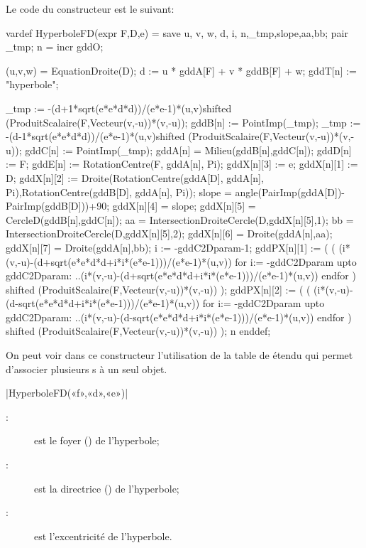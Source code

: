 \documentclass[a4paper,french]{article}
\begin{document}
Le code du constructeur est le suivant:
\begin{mpcode}
vardef HyperboleFD(expr F,D,e) =
  save u, v, w, d, i, n,_tmp,slope,aa,bb; 
  pair _tmp;
  n = incr gddO;

  (u,v,w) = EquationDroite(D);
  d := u * gddA[F] + v * gddB[F] + w;
  gddT[n] := "hyperbole"; 
  
  _tmp := -(d+1*sqrt(e*e*d*d))/(e*e-1)*(u,v)shifted (ProduitScalaire(F,Vecteur(v,-u))*(v,-u));
  gddB[n] := PointImp(_tmp);
  _tmp := -(d-1*sqrt(e*e*d*d))/(e*e-1)*(u,v)shifted
  (ProduitScalaire(F,Vecteur(v,-u))*(v,-u));
  gddC[n] := PointImp(_tmp);
  gddA[n] = Milieu(gddB[n],gddC[n]);
  gddD[n] := F;
  gddE[n] := RotationCentre(F, gddA[n], Pi);
  gddX[n][3] := e; %
  gddX[n][1] := D; %
  gddX[n][2] := Droite(RotationCentre(gddA[D], gddA[n], Pi),RotationCentre(gddB[D], gddA[n], Pi));
  slope = angle(PairImp(gddA[D])-PairImp(gddB[D]))+90;
  gddX[n][4] = slope;
  gddX[n][5] = CercleD(gddB[n],gddC[n]);
  aa = IntersectionDroiteCercle(D,gddX[n][5],1);
  bb = IntersectionDroiteCercle(D,gddX[n][5],2);
  gddX[n][6] = Droite(gddA[n],aa);
  gddX[n][7] = Droite(gddA[n],bb);
  i := -gddC2Dparam-1;
  gddPX[n][1] := (
    (
    (i*(v,-u)-(d+sqrt(e*e*d*d+i*i*(e*e-1)))/(e*e-1)*(u,v))
    for i:= -gddC2Dparam upto gddC2Dparam:
      ..(i*(v,-u)-(d+sqrt(e*e*d*d+i*i*(e*e-1)))/(e*e-1)*(u,v))
    endfor
  ) shifted (ProduitScalaire(F,Vecteur(v,-u))*(v,-u))
  );
  gddPX[n][2] := (
    (
    (i*(v,-u)-(d-sqrt(e*e*d*d+i*i*(e*e-1)))/(e*e-1)*(u,v))
    for i:= -gddC2Dparam upto gddC2Dparam:
      ..(i*(v,-u)-(d-sqrt(e*e*d*d+i*i*(e*e-1)))/(e*e-1)*(u,v))
    endfor
  ) shifted (ProduitScalaire(F,Vecteur(v,-u))*(v,-u))
  );
  n
enddef;
\end{mpcode}

On peut voir dans ce constructeur l'utilisation de la table de 
étendu  qui permet d'associer plusieurs s à
un seul objet. 

\begin{colourband}
  \macro|HyperboleFD(«f»,«d»,«e»)|
  \begin{description}
    \item[:] est le foyer () de l’hyperbole;
    \item[:] est la directrice () de l’hyperbole;
    \item[:] est l'excentricité de l'hyperbole. 
  \end{description}
\end{colourband}
\end{document}
